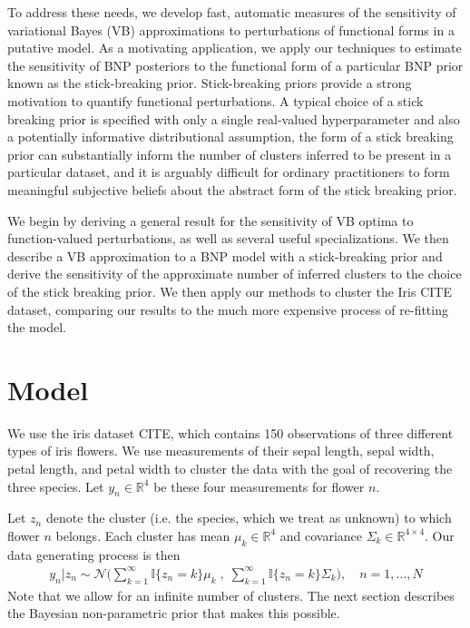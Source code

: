 \documentclass[a4paper]{article}
\begin{document}
To address these needs, we develop fast, automatic measures of the sensitivity of
variational Bayes (VB) approximations to perturbations of functional forms in a putative model.
As a motivating application, we apply our techniques to estimate the sensitivity of BNP posteriors
to the functional form of a particular BNP prior known as the stick-breaking prior.
Stick-breaking priors provide a strong motivation to
quantify functional perturbations. A typical choice of a stick breaking prior is
specified with only a single real-valued hyperparameter and also a potentially
informative distributional assumption, the form of a stick breaking prior can
substantially inform the number of clusters inferred to be present in a particular
dataset, and it is arguably difficult for ordinary practitioners to form meaningful
subjective beliefs about the abstract form of the stick breaking prior.

We begin by deriving a general result for the sensitivity of VB optima to
function-valued perturbations, as well as several useful specializations.
We then describe a VB approximation to a BNP model with a stick-breaking prior and
derive the sensitivity of the approximate number of inferred clusters to the choice of the stick breaking prior.
We then apply our methods to cluster the Iris CITE dataset,
comparing our results to the much more expensive process of re-fitting the model.

\section{Model}
We use the iris dataset CITE, which contains 150 observations of
three different types of iris flowers.
We use measurements of their
sepal length, sepal width, petal length, and petal width to cluster the data with
the goal of recovering the three species. Let $y_{n}\in \mathbb{R}^4$ be these four
measurements for flower $n$.

Let $z_n$ denote the cluster (i.e. the species, which we treat as unknown)
to which flower $n$ belongs.
Each cluster has mean $\mu_k\in \mathbb{R}^4$ and covariance $\Sigma_k \in \mathbb{R}^{4\times 4}$.
Our data generating process is then
\begin{align}
	y_n | z_n \sim \mathcal{N}\Big(\sum_{k=1}^\infty \mathbb{I}\{z_n = k\} \mu_k \;,
              \; \sum_{k=1}^\infty \mathbb{I}\{z_n = k\} \Sigma_k\Big),
	\quad n = 1, ..., N
\end{align}
Note that we allow for an infinite number of clusters. The next section describes
the Bayesian non-parametric prior that makes this possible.
\end{document}
